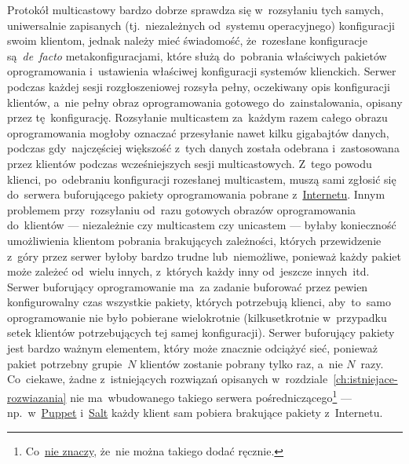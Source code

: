 \documentclass[thesis]{subfiles}
\begin{document}
Protokół multicastowy bardzo dobrze sprawdza się w~rozsyłaniu tych samych, uniwersalnie zapisanych (tj.~niezależnych od~systemu operacyjnego) konfiguracji swoim klientom, jednak należy mieć świadomość, że~rozesłane konfiguracje są~\emph{de~facto} metakonfiguracjami, które służą do~pobrania właściwych pakietów oprogramowania i~ustawienia właściwej konfiguracji systemów klienckich. Serwer podczas każdej sesji rozgłoszeniowej rozsyła pełny, oczekiwany opis konfiguracji klientów, a~nie pełny obraz oprogramowania gotowego do~zainstalowania, opisany przez tę~konfigurację. Rozsyłanie multicastem za~każdym razem całego obrazu oprogramowania mogłoby oznaczać przesyłanie nawet kilku gigabajtów danych, podczas gdy~najczęściej większość z~tych danych została odebrana i~zastosowana przez klientów podczas wcześniejszych sesji multicastowych. Z~tego powodu klienci, po~odebraniu konfiguracji rozesłanej multicastem, muszą sami zgłosić się do~serwera buforującego pakiety oprogramowania pobrane z~\href{http://sjp.pwn.pl/poradnia/haslo/;228}{Internetu}. Innym problemem przy~rozsyłaniu od~razu gotowych obrazów oprogramowania do~klientów --- niezależnie czy multicastem czy unicastem --- byłaby konieczność umożliwienia klientom pobrania brakujących zależności, których przewidzenie z~góry przez serwer byłoby bardzo trudne lub~niemożliwe, ponieważ każdy pakiet może zależeć od~wielu innych, z~których każdy inny od~jeszcze innych~itd. Serwer buforujący oprogramowanie ma~za zadanie buforować przez pewien konfigurowalny czas wszystkie pakiety, których potrzebują klienci, aby~to~samo oprogramowanie nie było pobierane wielokrotnie (kilkusetkrotnie w~przypadku setek klientów potrzebujących tej samej konfiguracji). Serwer buforujący pakiety jest bardzo ważnym elementem, który może znacznie odciążyć sieć, ponieważ pakiet potrzebny grupie~$N$ klientów zostanie pobrany tylko raz, a~nie $N$~razy. Co~ciekawe, żadne z~istniejących rozwiązań opisanych w~rozdziale~\ref{ch:istniejace-rozwiazania} nie ma~wbudowanego takiego serwera pośredniczącego\footnote{Co~\href{https://groups.google.com/forum/?fromgroups\#!topic/puppet-users/kszE7LDWejU}{nie znaczy}, że~nie można takiego dodać ręcznie.} --- np.~w~\hyperref[sec:puppet]{Puppet} i~\hyperref[sec:salt]{Salt} każdy klient sam pobiera brakujące pakiety z~Internetu.
\end{document}
